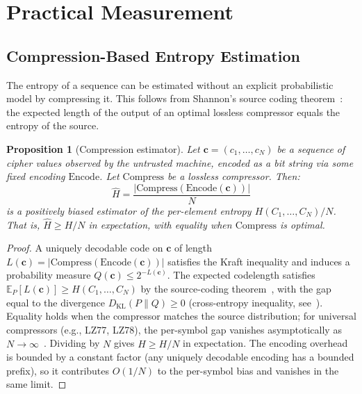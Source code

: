 \documentclass[conference]{IEEEtran}
\theoremstyle{definition}
\theoremstyle{plain}
\newtheorem{proposition}[theorem]{Proposition}
\theoremstyle{remark}
\begin{document}
\appendices
\label{app:start}

\section{Practical Measurement}
\label{sec:measurement}

\subsection{Compression-Based Entropy Estimation}

The entropy of a sequence can be estimated without an explicit
probabilistic model by compressing it.  This follows from Shannon's
source coding theorem~\cite{shannon1948mathematical}: the expected length
of the output of an optimal lossless compressor equals the entropy of the
source.

\begin{proposition}[Compression estimator]
\label{prop:compression}
Let $\mathbf{c} = (c_1, \ldots, c_N)$ be a sequence of cipher values
observed by the untrusted machine, encoded as a bit string via some
fixed encoding $\mathrm{Encode}$.  Let $\mathrm{Compress}$ be a lossless
compressor.  Then:
\begin{equation}
\hat{H} = \frac{|\mathrm{Compress}(\mathrm{Encode}(\mathbf{c}))|}{N}
\end{equation}
is a positively biased estimator of the per-element entropy
$H(C_1, \ldots, C_N) / N$.  That is, $\hat{H} \geq H/N$ in expectation,
with equality when $\mathrm{Compress}$ is optimal.
\end{proposition}

\begin{proof}
A uniquely decodable code on $\mathbf{c}$ of length
$L(\mathbf{c}) = |\mathrm{Compress}(\mathrm{Encode}(\mathbf{c}))|$
satisfies the Kraft inequality and induces a probability measure
$Q(\mathbf{c}) \leq 2^{-L(\mathbf{c})}$.  The expected codelength
satisfies $\mathbb{E}_P[L(\mathbf{c})] \geq H(C_1, \ldots, C_N)$ by
the source-coding theorem~\cite{shannon1948mathematical}, with the gap
equal to the divergence $D_{\mathrm{KL}}(P \| Q) \geq 0$ (cross-entropy
inequality, see~\cite[Thm.~5.4.3]{cover2006elements}).  Equality holds
when the compressor matches the source distribution; for universal
compressors (e.g., LZ77, LZ78), the per-symbol gap vanishes
asymptotically as $N \to \infty$~\cite{shannon1948mathematical}.
Dividing by $N$ gives $\hat{H} \geq H/N$ in expectation.  The
encoding overhead is bounded by a constant factor (any uniquely
decodable encoding has a bounded prefix), so it contributes
$O(1/N)$ to the per-symbol bias and vanishes in the same limit.
\end{proof}
\end{document}
